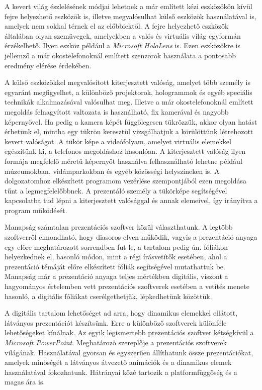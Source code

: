 A kevert világ észlelésének módjai lehetnek a már említett kézi eszközökön kívül fejre helyezhető eszközök is, illetve megvalósulhat külső eszközök használatával is, amelyek nem sokkal térnek el az előbbiektől.
A fejre helyezhető eszközök általában olyan szemüvegek, amelyekben a valós és virtuális világ egyformán érzékelhető. Ilyen eszköz például a \textit{Microsoft HoloLens} is. Ezen eszközökre is jellemző a már okostelefonoknál említett szenzorok használata a pontosabb eredmény elérése érdekében.

A külső eszközökkel megvalósított kiterjesztett valóság, amelyet több személy is egyaránt megfigyelhet, a különböző projektorok, hologrammok és egyéb speciális technikák alkalmazásával valósulhat meg. Illetve a már okostelefonoknál említett megoldás felnagyított valtozata is használható, fix kamerával és nagyobb képernyővel. Ha pedig a kamera képét függőlegesen tükrözzük, akkor olyan hatást érhetünk el, mintha egy tükrön keresztül vizsgálhatjuk a körülöttünk létrehozott kevert valóságot. A tükör képe a videófolyam, amelyet virtuális elemekkel egészítünk ki, a telefonos megoldáshoz hasonlóan. A kiterjesztett valóság ilyen formája megfelelő méretű képernyőt használva felhasználható lehetne például múzeumokban, vidámparkokban és egyéb közösségi helyszíneken is. A dolgozatomhoz elkészített programom vezérlése szempontjából ezen megoldása tűnt a legmegfelelőbbnek. A prezentáló személy a tükörképe segítségével kapcsolatba tud lépni a kiterjesztett valósággal és annak elemeivel, így irányítva a program működését.



Manapság számtalan prezentációs szoftver közül választhatunk. A legtöbb szoftverről elmondható, hogy diasoros elven működik, vagyis a prezentáció anyaga egy előre meghatározott sorrendben fut le, a tartalom pedig ún. fóliákon helyezkednek el, hasonló módon, mint a régi írásvetítők esetében, ahol a prezentáció témáját előre elkészített fóliák segítségével mutathattuk be. Manapság már a prezentáció anyaga teljes mértékben digitális, viszont a hagyományos értelemben vett prezentációs szoftverek esetében a vetítés menete hasonló, a digitális fóliákat cserélgethetjük, lépkedhetünk közöttük.

A digitális tartalom lehetőséget ad arra, hogy dinamikus elemekkel ellátott, látványos prezentációt készítsünk. Erre a különböző szoftverek különféle lehetőségeket kínálnak.
Az egyik legismertebb prezentációs szoftver kétségkívül a \textit{Microsoft PowerPoint}. Meghatározó szereplője a prezentációs szoftverek világának. Használatával gyorsan és egyszerűen állíthatunk össze prezentációkat, amelyek minőségét a látványos átvezető animációk és a dinamikus elemek használatával fokozhatunk. Hátrányai közé tartozik a platformfüggőség és a magas ára is.

